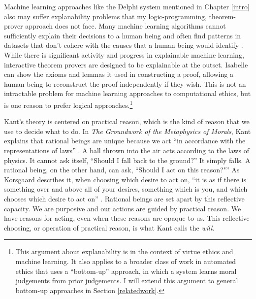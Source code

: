 \begin{isabellebody}
\begin{isamarkuptext}
Machine learning approaches like the Delphi system \citep{delphi} mentioned in Chapter \ref{intro} also may suffer explanability 
problems that my logic-programming, theorem-prover
approach does not face. Many machine learning algorithms cannot sufficiently explain their 
decisions to a human being and often find patterns in datasets that don't 
cohere with the causes that a human being would identify \citep{puiutta}. While there is significant activity 
and progress in explainable machine learning, interactive theorem provers are designed to be explainable 
at the outset. Isabelle can show the axioms and lemmas it used in constructing a proof, 
allowing a human being to reconstruct the proof independently if they wish. This is not an 
intractable problem for machine learning approaches to computational ethics, but is one reason to 
prefer logical approaches.\footnote{This argument about explanability is in the context of virtue ethics and 
machine learning. It also applies to a broader class of work in automated ethics 
that uses a ``bottom-up'' approach, in which a system learns moral judgements from prior judgements. 
I will extend this argument to general bottom-up approaches in Section \ref{relatedwork}.}%
\end{isamarkuptext}\isamarkuptrue%
%
\isadelimdocument
%
\endisadelimdocument
%
\isatagdocument
%
\isamarkuptrue%
%
\endisatagdocument
{\isafolddocument}%
%
\isadelimdocument
%
\endisadelimdocument
%
\begin{isamarkuptext}%
Kant's theory is centered 
on practical reason, which is the kind of reason that we 
use to decide what to do. In \emph{The Groundwork of the Metaphysics of Morals}, Kant explains that 
rational beings are unique because we act ``in accordance with 
the representations of laws'' \citep[26]{groundwork}. A ball thrown into the air acts 
according to the laws of physics. It cannot ask itself, ``Should I fall back to the ground?'' 
It simply falls. A rational being, on the other hand, can ask, ``Should I act on this reason?"''
As Korsgaard describes it, when choosing which desire to act on, ``it is as if there is something over 
and above all of your desires, something which is you, and which chooses which desire to act on'' \citep[100]{sources}. 
Rational beings are set apart by this reflective capacity. We are purposive and 
our actions are guided by practical reason. We have reasons for acting, even when these reasons are
opaque to us. This reflective choosing, or operation of practical reason, is what Kant calls the \emph{will}. 


\end{isamarkuptext}
\end{isabellebody}
